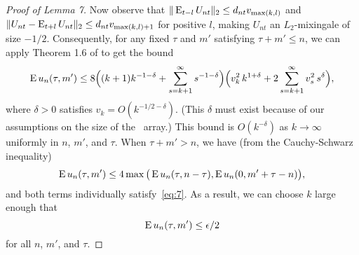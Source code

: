 \documentclass[11pt]{article}
\begin{document}
{\begin{proof}[Proof of Lemma 7]
  Now observe that $\| \operatorname{E}_{t-l} U_{nt} \|_2 \leq d_{nt} v_{\max(k,l)}$
  and $\| U_{nt} - \operatorname{E}_{t+l} U_{nt} \|_2 \leq d_{nt} v_{\max(k,l)+1}$
  for positive $l$, making $U_{nt}$ an $L_2$-mixingale of size $-1/2$.
  Consequently, for any fixed $\tau$ and $m'$ satisfying $\tau + m'
  \leq n$, we can apply Theorem 1.6 of \cite{Mcl:75} to get the bound
  \begin{equation}\label{eq:7}
    \operatorname{E} u_n(\tau, m') \leq
    8 \Big((k + 1) k^{-1-\delta} + \sum_{s=k+1}^\infty s^{-1-\delta}\Big)
    \Big(v_k^2 \, k^{1+\delta} + 2 \sum_{s=k+1}^\infty v_s^2 \, s^\delta\Big),
  \end{equation}
  where $\delta > 0$ satisfies $v_k = O(k^{-1/2 - \delta})$. (This
  $\delta$ must exist because of our assumptions on the size of the
  \ned\ array.) This bound is $O(k^{-\delta})$ as $k \to \infty$
  uniformly in $n$, $m'$, and $\tau$.
  When $\tau + m' > n$, we have (from the Cauchy-Schwarz inequality)
  \begin{equation*}
    \operatorname{E} u_n(\tau, m') \leq
    4 \max\big( \operatorname{E} u_n(\tau, n - \tau),
                \operatorname{E} u_n(0, m' + \tau - n) \big),
  \end{equation*}
  and both terms individually satisfy~\eqref{eq:7}. As a result, we
  can choose $k$ large enough that
  \begin{equation*}
    \operatorname{E} u_n(\tau, m') \leq \epsilon/2
  \end{equation*}
  for all $n$, $m'$, and $\tau$.


\end{proof}}
\end{document}
